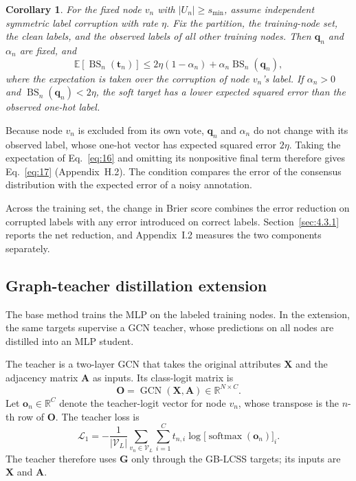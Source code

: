 \documentclass[10pt,letterpaper,nopreprintline]{elsarticle}
\theoremstyle{definition}
\theoremstyle{plain}
\newtheorem{corollary}{Corollary}
\begin{document}
\begin{corollary}\label{cor:expected}
For the fixed node \(v_n\) with \(|U_n|\geq s_{\min}\), assume independent symmetric label corruption with rate \(\eta\). Fix the partition, the training-node set, the clean labels, and the observed labels of all other training nodes. Then \(\mathbf q_n\) and \(\alpha_n\) are fixed, and
\begin{equation}\label{eq:17}
\mathbb E[\operatorname{BS}_n(\mathbf t_n)]\leq2\eta(1-\alpha_n)+\alpha_n\operatorname{BS}_n(\mathbf q_n),
\end{equation}
where the expectation is taken over the corruption of node \(v_n\)'s label. If \(\alpha_n>0\) and \(\operatorname{BS}_n(\mathbf q_n)<2\eta\), the soft target has a lower expected squared error than the observed one-hot label.
\end{corollary}

Because node \(v_n\) is excluded from its own vote, \(\mathbf q_n\) and \(\alpha_n\) do not change with its observed label, whose one-hot vector has expected squared error \(2\eta\). Taking the expectation of Eq.~\eqref{eq:16} and omitting its nonpositive final term therefore gives Eq.~\eqref{eq:17} (Appendix~H.2). The condition compares the error of the consensus distribution with the expected error of a noisy annotation.

Across the training set, the change in Brier score combines the error reduction on corrupted labels with any error introduced on correct labels. Section~\ref{sec:4.3.1} reports the net reduction, and Appendix~I.2 measures the two components separately.

\subsection{Graph-teacher distillation extension}\label{sec:3.5}

The base method trains the MLP on the labeled training nodes. In the extension, the same targets supervise a GCN teacher, whose predictions on all nodes are distilled into an MLP student.

\Needspace{64pt}
The teacher is a two-layer GCN that takes the original attributes \(\mathbf X\) and the adjacency matrix \(\mathbf A\) as inputs. Its class-logit matrix is
\begin{equation}\label{eq:18}
\mathbf O=\operatorname{GCN}(\mathbf X,\mathbf A)\in\mathbb R^{N\times C}.
\end{equation}
Let \(\mathbf o_n\in\mathbb R^C\) denote the teacher-logit vector for node \(v_n\), whose transpose is the \(n\)-th row of \(\mathbf O\). The teacher loss is
\begin{equation}\label{eq:19}
\mathcal L_1=-\frac{1}{|\mathcal V_L|}\sum_{v_n\in\mathcal V_L}\sum_{i=1}^C t_{n,i}\log\bigl[\operatorname{softmax}(\mathbf o_n)\bigr]_i.
\end{equation}
The teacher therefore uses \(\mathbf G\) only through the GB-LCSS targets; its inputs are \(\mathbf X\) and \(\mathbf A\).
\end{document}
